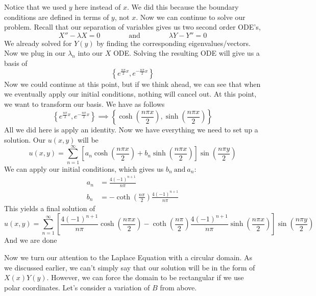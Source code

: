 \documentclass{article}
\begin{document}
Notice that we used $y$ here instead of $x$. We did this because the boundary conditions are defined in terms of $y$, not $x$. Now we can continue to solve our problem. Recall that our separation of variables gives us two second order ODE's,
\[
X'' - \lambda X = 0 \qquad\qquad \text{and} \qquad\qquad \lambda Y - Y'' = 0
\]
We already solved for $Y(y)$ by finding the corresponding eigenvalues/vectors. Now we plug in our $\lambda_{n}$ into our $X$ ODE. Solving the resulting ODE will give us a basis of
\[
\left\{ e^{\frac{n\pi}{2}x}, e^{-\frac{n\pi}{2}x} \right\}
\]
Now we could continue at this point, but if we think ahead, we can see that when we eventually apply our initial conditions, nothing will cancel out. At this point, we want to transform our basis. We have as follows
\[
\left\{ e^{\frac{n\pi}{2}x}, e^{-\frac{n\pi}{2}x} \right\} \implies \left\{ \cosh{\left(\frac{n\pi x}{2}\right)}, \sinh{\left(\frac{n\pi x}{2}\right)} \right\}
\]
All we did here is apply an identity. Now we have everything we need to set up a solution. Our $u(x,y)$ will be
\[
u(x,y) = \sum_{n=1}^{\infty}\left[a_{n}\cosh{\left(\frac{n\pi x}{2}\right)} + b_{n}\sinh{\left(\frac{n\pi x}{2}\right)}\right]\sin{\left(\frac{n\pi y}{2}\right)}
\]
We can apply our initial conditions, which gives us $b_{n}\ \text{and}\ a_{n}$:
\begin{align*}
a_{n} &= \frac{4(-1)^{n+1}}{n\pi}\\
b_{n} &= -\coth{\left(\frac{n \pi}{2}\right)}\frac{4(-1)^{n+1}}{n\pi}
\end{align*}
This yields a final solution of
\[
u(x,y) = \sum_{n=1}^{\infty}\left[ \frac{4(-1)^{n+1}}{n\pi} \cosh{\left(\frac{n\pi x}{2}\right)} -\coth{\left(\frac{n \pi}{2}\right)}\frac{4(-1)^{n+1}}{n\pi}\sinh{\left(\frac{n\pi x}{2}\right)}\right]\sin{\left(\frac{n\pi y}{2}\right)}
\]
And we are done
\newpage


\indent Now we turn our attention to the Laplace Equation with a circular domain. As we discussed earlier, we can't simply say that our solution will be in the form of $X(x)Y(y)$. However, we can force the domain to be rectangular if we use polar coordinates. Let's consider a variation of $B$ from above.\\\\
\end{document}
